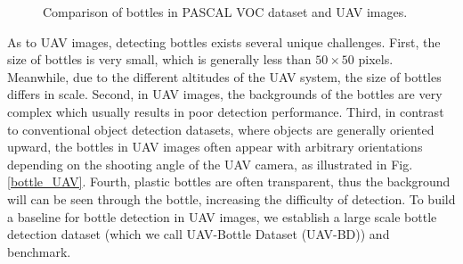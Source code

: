 \begin{figure}
	\centering
	
	\caption{Comparison of bottles in PASCAL VOC dataset and UAV images.}
	\label{bottle_VOC_UAV}
\end{figure}


As to UAV images, detecting bottles exists several unique challenges. First, the size of bottles is very small, which is generally less than $ 50\times 50 $ pixels. Meanwhile, due to the different altitudes of the UAV system, the size of bottles differs in scale. Second, in UAV images, the backgrounds of the bottles are very complex which usually results in poor detection performance. Third, in contrast to conventional object detection datasets, where objects are generally oriented upward\cite{DOTA}, the bottles in UAV images often appear with arbitrary orientations depending on the shooting angle of the UAV camera, as illustrated in Fig.\ref{bottle_UAV}. Fourth, plastic bottles are often transparent, thus the background will can be seen through the bottle, increasing the difficulty of detection. To build a baseline for bottle detection in UAV images, we establish a large scale bottle detection dataset (which we call UAV-Bottle Dataset (UAV-BD)) and benchmark.

